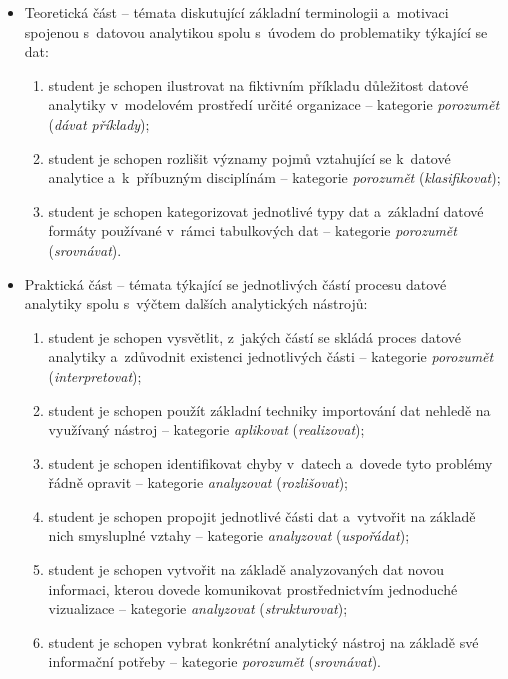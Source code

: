 \begin{itemize}
\tightlist
\item
  Teoretická část -- témata diskutující základní terminologii a~motivaci spojenou s~datovou analytikou spolu s~úvodem do problematiky týkající se dat:

  \begin{enumerate}
  \def\labelenumi{\arabic{enumi}.}
  \tightlist
  \item
    student je schopen ilustrovat na fiktivním příkladu důležitost datové analytiky v~modelovém prostředí určité organizace -- kategorie \emph{porozumět} (\emph{dávat příklady});
  \item
    student je schopen rozlišit významy pojmů vztahující se k~datové analytice a~k~příbuzným disciplínám -- kategorie \emph{porozumět} (\emph{klasifikovat});
  \item
    student je schopen kategorizovat jednotlivé typy dat a~základní datové formáty používané v~rámci tabulkových dat -- kategorie \emph{porozumět} (\emph{srovnávat}).
  \end{enumerate}
\item
  Praktická část -- témata týkající se jednotlivých částí procesu datové analytiky spolu s~výčtem dalších analytických nástrojů:

  \begin{enumerate}
  \def\labelenumi{\arabic{enumi}.}
  \setcounter{enumi}{3}
  \tightlist
  \item
    student je schopen vysvětlit, z~jakých částí se skládá proces datové analytiky a~zdůvodnit existenci jednotlivých části -- kategorie \emph{porozumět} (\emph{interpretovat});
  \item
    student je schopen použít základní techniky importování dat nehledě na využívaný nástroj -- kategorie \emph{aplikovat} (\emph{realizovat});
  \item
    student je schopen identifikovat chyby v~datech a~dovede tyto problémy řádně opravit -- kategorie \emph{analyzovat} (\emph{rozlišovat});
  \item
    student je schopen propojit jednotlivé části dat a~vytvořit na základě nich smysluplné vztahy -- kategorie \emph{analyzovat} (\emph{uspořádat});
  \item
    student je schopen vytvořit na základě analyzovaných dat novou informaci, kterou dovede komunikovat prostřednictvím jednoduché vizualizace -- kategorie \emph{analyzovat} (\emph{strukturovat});
  \item
    student je schopen vybrat konkrétní analytický nástroj na základě své informační potřeby -- kategorie \emph{porozumět} (\emph{srovnávat}).
  \end{enumerate}
\end{itemize}

